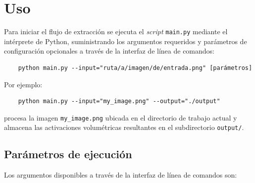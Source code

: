 \section{Uso}
Para iniciar el flujo de extracción se ejecuta el \textit{script} \texttt{main.py} mediante el intérprete de Python, suministrando 
los argumentos requeridos y parámetros de configuración opcionales a través de la interfaz de línea de comandos:

\begin{verbatim}
    python main.py --input="ruta/a/imagen/de/entrada.png" [parámetros]
\end{verbatim}

Por ejemplo:
\begin{verbatim}
    python main.py --input="my_image.png" --output="./output"
\end{verbatim}
procesa la imagen \texttt{my\_image.png} ubicada en el directorio de trabajo actual y almacena las activaciones volumétricas 
resultantes en el subdirectorio \texttt{output/}.

\subsection{Parámetros de ejecución}
Los argumentos disponibles a través de la interfaz de línea de comandos son:

